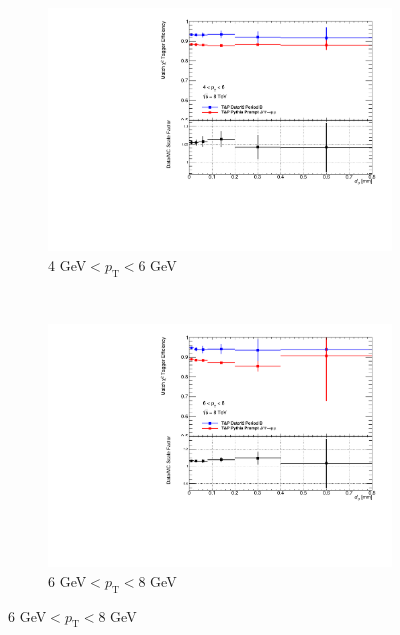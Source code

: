 \begin{figure}[tbhp]
  \centering
  \begin{subfigure}[b]{0.55\textwidth}
    \includegraphics[width=\textwidth]{PartCalibration2012/Plots/SFPlots/ptCourse_4_6__smt.pdf}
    \caption{4 GeV$<p_{\textrm{T}}<$6 GeV} \label{fig:CalibrationD04to6}
  \end{subfigure}
  ~
  \begin{subfigure}[b]{0.55\textwidth}
    \includegraphics[width=\textwidth]{PartCalibration2012/Plots/SFPlots/ptCourse_6_8__smt.pdf}
    \caption{6 GeV$<p_{\textrm{T}}<$8 GeV} \label{fig:CalibrationD06to8}
  \end{subfigure}


\end{figure}
